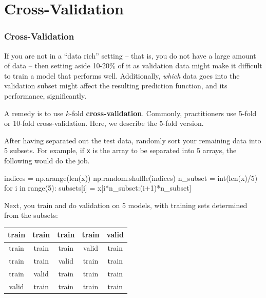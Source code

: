 \documentclass[smaller]{beamer}
\newenvironment{codeblock}
    {\hfill\begin{beamerboxesrounded}[lower=codecol, width=0.8\textwidth]
    \medskip

    }
    { 
    \end{beamerboxesrounded}\hfill
    }
\theoremstyle{example}
\newcommand{\ttt}[1]{{\small\texttt{#1}}}
\begin{document}
\section{Cross-Validation}

\begin{frame}[fragile]
    \frametitle{Cross-Validation}
    If you are not in a ``data rich'' setting {--} that is, you do not have a large amount of data {--} then setting aside 10-20\% of it as validation data might make it difficult to train a model that performs well. Additionally, \textit{which} data goes into the validation subset might affect the resulting prediction function, and its performance, significantly.
    
    A remedy is to use $k$-fold \textbf{cross-validation}. Commonly, practitioners use 5-fold or 10-fold cross-validation. Here, we describe the 5-fold version. 

    After having separated out the test data, randomly sort your remaining data into 5 subsets. For example, if \ttt{x} is the array to be separated into 5 arrays, the following would do the job.

\begin{codeblock}

\begin{python}
indices = np.arange(len(x))
np.random.shuffle(indices)
n_subset = int(len(x)/5)
for i in range(5):
    subsets[i] = x[i*n_subset:(i+1)*n_subset]
\end{python}

\end{codeblock}

Next, you train and do validation on 5 models, with training sets determined from the subsets:

\begin{center}
    \begin{tabular}{|c|c|c|c|c|}
        \hline 
        train & train & train & train & valid \\ 
        \hline
        \hline
        train & train & train & valid & train \\ 
        \hline
        \hline
        train & train & valid & train & train \\ 
        \hline
        \hline
        train & valid & train & train & train \\ 
        \hline
        \hline
        valid & train & train & train & train \\
        \hline
    \end{tabular}
\end{center}
\end{frame}
\end{document}
